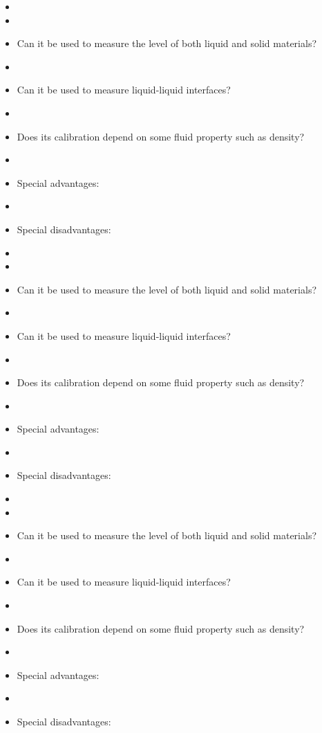 \vskip 10pt

\begin{itemize}
\goodbreak
\item{} 
\item\item{} Can it be used to measure the level of both liquid and solid materials?
\item\item{} Can it be used to measure liquid-liquid interfaces?
\item\item{} Does its calibration depend on some fluid property such as density?
\item\item{} Special advantages:
\item\item{} Special disadvantages:
\end{itemize}

\vskip 10pt

\begin{itemize}
\goodbreak
\item{} 
\item\item{} Can it be used to measure the level of both liquid and solid materials?
\item\item{} Can it be used to measure liquid-liquid interfaces?
\item\item{} Does its calibration depend on some fluid property such as density?
\item\item{} Special advantages:
\item\item{} Special disadvantages:
\end{itemize}

\vskip 10pt

\begin{itemize}
\goodbreak
\item{} 
\item\item{} Can it be used to measure the level of both liquid and solid materials?
\item\item{} Can it be used to measure liquid-liquid interfaces?
\item\item{} Does its calibration depend on some fluid property such as density?
\item\item{} Special advantages:
\item\item{} Special disadvantages:
\end{itemize}

